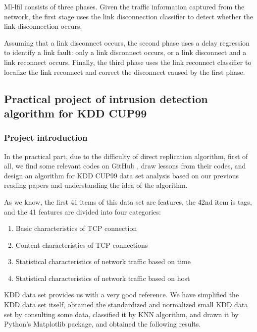 \documentclass[UTF8]{article}
\begin{document}
Ml-lfil consists of three phases. Given the traffic information captured from the network, the first stage uses the link disconnection classifier to detect whether the link disconnection occurs.

Assuming that a link disconnect occurs, the second phase uses a delay regression to identify a link fault: only a link disconnect occurs, or a link disconnect and a link reconnect occurs. Finally, the third phase uses the link reconnect classifier to localize the link reconnect and correct the disconnect caused by the first phase.


\subsection{ Practical project of intrusion detection algorithm for KDD CUP99 }

\subsubsection{Project introduction}

In the practical part, due to the difficulty of direct replication algorithm, first of all, we find some relevant codes on GitHub \cite{14}, draw lessons from their codes, and design an algorithm for KDD CUP99 data set analysis based on our previous reading papers and understanding the idea of the algorithm.

As we know, the first 41 items of this data set are features, the 42nd item is tags, and the 41 features are divided into four categories:

\begin{enumerate}

\item Basic characteristics of TCP connection

\item Content characteristics of TCP connections

\item Statistical characteristics of network traffic based on time

\item Statistical characteristics of network traffic based on host

\end{enumerate}

KDD data set provides us with a very good reference. We have simplified the KDD data set itself, obtained the standardized and normalized small KDD data set by consulting some data, classified it by KNN algorithm, and drawn it by Python's Matplotlib package, and obtained the following results.
\end{document}
